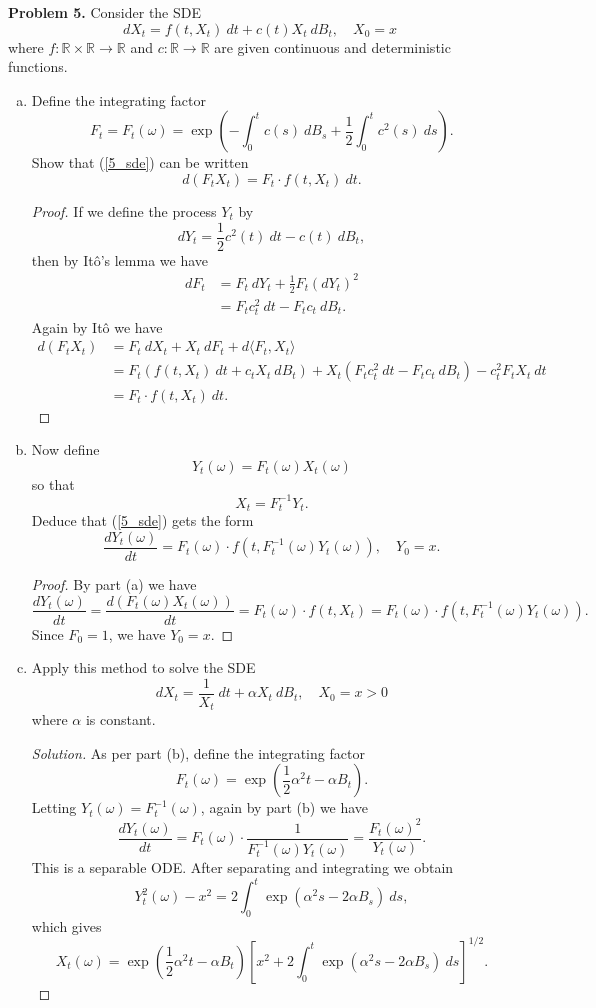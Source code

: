 \documentclass[11pt,letterpaper]{report}
\newcommand{\reals}{\mathbb{R}}
\newenvironment{solution}
{\begin{proof}[Solution]}
{\end{proof}}
\begin{document}
\noindent\textbf{Problem 5. }
Consider the SDE
\begin{equation}\label{5_sde}
dX_t = f(t, X_t)\ dt + c(t)X_t\ dB_t,\quad X_0 = x
\end{equation}
where $f: \reals\times\reals\to \reals$ and $c:\reals\to \reals$ are given continuous and deterministic functions.
\begin{enumerate}[(a)]
	\item Define the integrating factor
	\[
	F_t = F_t(\omega) = \exp\left(-\int_0^tc(s)\ dB_s + \frac{1}{2}\int_0^tc^2(s)\ ds\right).
	\]
	Show that (\ref{5_sde}) can be written
	\[
	d(F_tX_t) = F_t\cdot f(t, X_t)\ dt.
	\]
	\begin{proof}
		If we define the process $Y_t$ by
		\[
		dY_t = \frac{1}{2}c^2(t)\ dt - c(t)\ dB_t,
		\]
		then by It\^o's lemma we have
		\begin{align*}
		dF_t &= F_t\ dY_t + \frac{1}{2}F_t(dY_t)^2\\
		&= F_tc_t^2\ dt - F_tc_t\ dB_t.
		\end{align*}
		Again by It\^o we have
		\begin{align*}
			d(F_tX_t) &= F_t\ dX_t + X_t\ dF_t + d\langle F_t, X_t\rangle\\
			&= F_t(f(t, X_t)\ dt + c_tX_t\ dB_t) + X_t(F_tc_t^2\ dt - F_tc_t\ dB_t) - c_t^2F_tX_t\ dt\\
			&= F_t\cdot f(t, X_t)\ dt.
		\end{align*}
	\end{proof}

	\item Now define
	\[
	Y_t(\omega) = F_t(\omega)X_t(\omega)
	\]
	so that
	\[
	X_t = F_t^{-1}Y_t.
	\]
	Deduce that (\ref{5_sde}) gets the form
	\[
	\frac{dY_t(\omega)}{dt} = F_t(\omega)\cdot f(t, F_t^{-1}(\omega)Y_t(\omega)),\quad Y_0 = x.
	\]
	\begin{proof}
		By part (a) we have
		\[
		\frac{dY_t(\omega)}{dt} = \frac{d(F_t(\omega)X_t(\omega))}{dt} = F_t(\omega)\cdot f(t, X_t) = F_t(\omega)\cdot f(t, F_t^{-1}(\omega)Y_t(\omega)).
		\]
		Since $F_0 = 1$, we have $Y_0 = x$.
	\end{proof}

	\item Apply this method to solve the SDE
	\[
	dX_t = \frac{1}{X_t}\ dt + \alpha X_t\ dB_t,\quad X_0 = x > 0
	\]
	where $\alpha$ is constant.
	\begin{solution}
		As per part (b), define the integrating factor
		\[
		F_t(\omega) = \exp\left(\frac{1}{2}\alpha^2t - \alpha B_t \right).
		\]
		Letting $Y_t(\omega) = F_t^{-1}(\omega)$, again by part (b) we have
		\[
		\frac{dY_t(\omega)}{dt} = F_t(\omega)\cdot\frac{1}{F_t^{-1}(\omega)Y_t(\omega)} = \frac{F_t(\omega)^2}{Y_t(\omega)}.
		\]
		This is a separable ODE. After separating and integrating we obtain
		\[
		Y_t^2(\omega)-x^2 = 2\int_0^t\exp(\alpha^2s - 2\alpha B_s)\ ds,
		\]
		which gives
		\[
		X_t(\omega) = \exp\left(\frac{1}{2}\alpha^2t - \alpha B_t\right)\left[x^2 + 2\int_0^t\exp(\alpha^2s-2\alpha B_s)\ ds\right]^{1/2}.
		\]
	\end{solution}


\end{enumerate}
\end{document}
